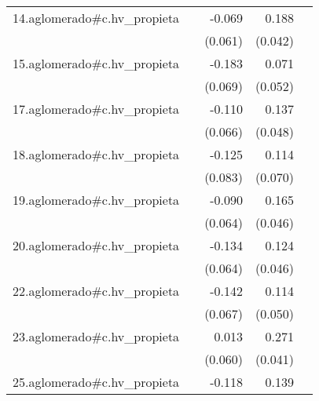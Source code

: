 {\begin{longtable}{l*{4}{D{.}{.}{-1}}}
\addlinespace
14.aglomerado#c.hv\_propieta&                     &      -0.069         &       0.188\sym{***}&                     \\
            &                     &     (0.061)         &     (0.042)         &                     \\
\addlinespace
15.aglomerado#c.hv\_propieta&                     &      -0.183\sym{**} &       0.071         &                     \\
            &                     &     (0.069)         &     (0.052)         &                     \\
\addlinespace
17.aglomerado#c.hv\_propieta&                     &      -0.110         &       0.137\sym{**} &                     \\
            &                     &     (0.066)         &     (0.048)         &                     \\
\addlinespace
18.aglomerado#c.hv\_propieta&                     &      -0.125         &       0.114         &                     \\
            &                     &     (0.083)         &     (0.070)         &                     \\
\addlinespace
19.aglomerado#c.hv\_propieta&                     &      -0.090         &       0.165\sym{***}&                     \\
            &                     &     (0.064)         &     (0.046)         &                     \\
\addlinespace
20.aglomerado#c.hv\_propieta&                     &      -0.134\sym{*}  &       0.124\sym{**} &                     \\
            &                     &     (0.064)         &     (0.046)         &                     \\
\addlinespace
22.aglomerado#c.hv\_propieta&                     &      -0.142\sym{*}  &       0.114\sym{*}  &                     \\
            &                     &     (0.067)         &     (0.050)         &                     \\
\addlinespace
23.aglomerado#c.hv\_propieta&                     &       0.013         &       0.271\sym{***}&                     \\
            &                     &     (0.060)         &     (0.041)         &                     \\
\addlinespace
25.aglomerado#c.hv\_propieta&                     &      -0.118         &       0.139\sym{**} &                     \\

\end{longtable}}
